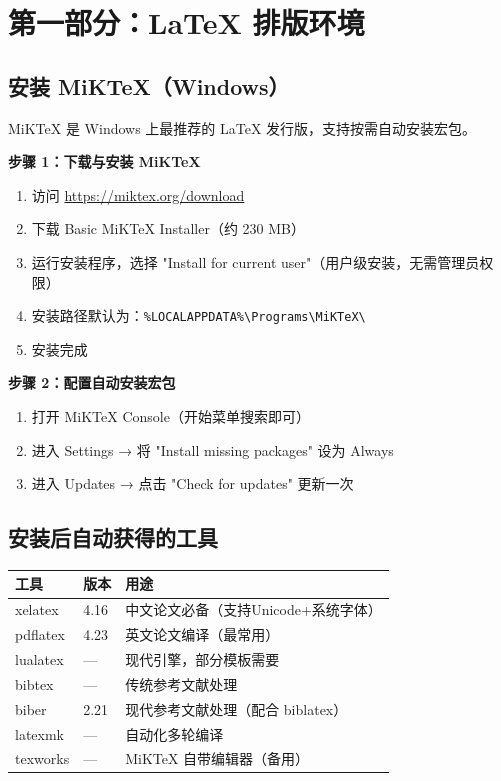 \documentclass[12pt,a4paper]{ctexart}
\begin{document}
\section{第一部分：LaTeX 排版环境}

\subsection{安装 MiKTeX（Windows）}

MiKTeX 是 Windows 上最推荐的 LaTeX 发行版，支持按需自动安装宏包。

\textbf{步骤 1：下载与安装 MiKTeX}

\begin{enumerate}
  \item 访问 \url{https://miktex.org/download}
  \item 下载 Basic MiKTeX Installer（约 230 MB）
  \item 运行安装程序，选择 "Install for current user"（用户级安装，无需管理员权限）
  \item 安装路径默认为：\texttt{\%LOCALAPPDATA\%\textbackslash Programs\textbackslash MiKTeX\textbackslash}
  \item 安装完成
\end{enumerate}

\textbf{步骤 2：配置自动安装宏包}

\begin{enumerate}
  \item 打开 MiKTeX Console（开始菜单搜索即可）
  \item 进入 Settings → 将 "Install missing packages" 设为 Always
  \item 进入 Updates → 点击 "Check for updates" 更新一次
\end{enumerate}

\subsection{安装后自动获得的工具}

\begin{table}[H]
\centering
\begin{tabular}{llp{7cm}}
\toprule
\textbf{工具} & \textbf{版本} & \textbf{用途} \\
\midrule
xelatex & 4.16 & 中文论文必备（支持Unicode+系统字体） \\
pdflatex & 4.23 & 英文论文编译（最常用） \\
lualatex & --- & 现代引擎，部分模板需要 \\
bibtex & --- & 传统参考文献处理 \\
biber & 2.21 & 现代参考文献处理（配合 biblatex） \\
latexmk & --- & 自动化多轮编译 \\
texworks & --- & MiKTeX 自带编辑器（备用） \\
\bottomrule
\end{tabular}
\end{table}
\end{document}
